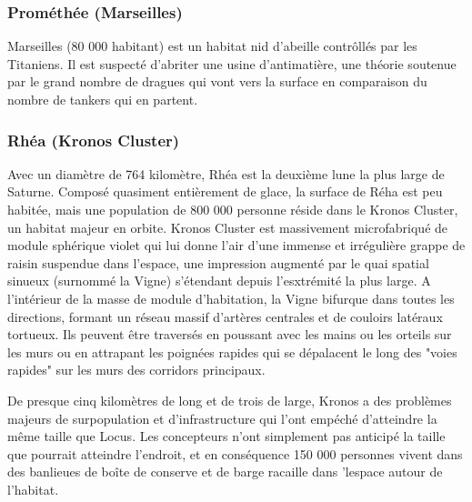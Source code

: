                                                                      \subsubsection{Prométhée (Marseilles)} \label{sec:prom-mars} 

                                                                     Marseilles (80 000 habitant) est un habitat nid d'abeille contrôllés par les Titaniens. Il est suspecté d'abriter une usine d'antimatière, une théorie soutenue par le grand nombre de dragues qui vont vers la surface en comparaison du nombre de tankers qui en partent. 

                                                                     \subsubsection{Rhéa (Kronos Cluster)} \label{sec:rhea-kronos-cluster} 

                                                                     Avec un diamètre de 764 kilomètre, Rhéa est la deuxième lune la plus large de Saturne. Composé quasiment entièrement de glace, la surface de Réha est peu habitée, mais une population de 800 000 personne réside dans le Kronos Cluster, un habitat majeur en orbite. Kronos Cluster est massivement microfabriqué de module sphérique violet qui lui donne l'air d'une immense et irrégulière grappe de raisin suspendue dans l'espace, une impression augmenté par le quai spatial sinueux (surnommé la Vigne) s'étendant depuis l'esxtrémité la plus large. A l'intérieur de la masse de module d'habitation, la Vigne bifurque dans toutes les directions, formant un réseau massif d'artères centrales et de couloirs latéraux tortueux. Ils peuvent être traversés en poussant avec les mains ou les orteils sur les murs ou en attrapant les poignées rapides qui se dépalacent le long des "voies rapides" sur les murs des corridors principaux. 

                                                                     De presque cinq kilomètres de long et de trois de large, Kronos a des problèmes majeurs de surpopulation et d'infrastructure qui l'ont empéché d'atteindre la même taille que Locus. Les concepteurs n'ont simplement pas anticipé la taille que pourrait atteindre l'endroit, et en conséquence 150 000 personnes vivent dans des banlieues de boîte de conserve et de barge racaille dans 'lespace autour de l'habitat. 

